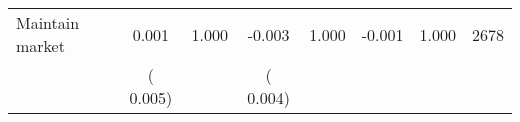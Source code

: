 \begin{tabular}{l*{7}{c}}
 Maintain market       &              0.001       &        1.000  &             -0.003       &        1.000  &             -0.001       &              1.000 &  2678 \\ 
                       &       (       0.005)             &                               &       (       0.004)                     &                               &                                               &                                &                      \\ 

\hline \end{tabular}